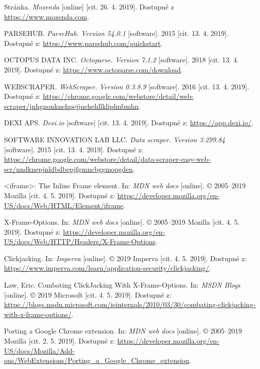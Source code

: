 \documentclass[thesis=B,czech]{FITthesis}[2012/06/26]
\begin{document}
\begin{thebibliography}{99}
	Stránka. \textit{Mozenda} [online] [cit. 26. 4. 2019]. Dostupné z \url{https://www.mozenda.com}.
	
	PARSEHUB. \textit{ParseHub. Version 54.0.1} [software]. 2015 [cit. 13. 4. 2019]. Dostupné z: \url{https://www.parsehub.com/quickstart}.
	
	OCTOPUS DATA INC. \textit{Octoparse. Version 7.1.2} [software]. 2018 [cit. 13. 4. 2019]. Dostupné z: \url{https://www.octoparse.com/download}.
	
	WEBSCRAPER. \textit{WebScraper. Version 0.3.8.9} [software]. 2016 [cit. 13. 4. 2019]. Dostupné z: \url{https://chrome.google.com/webstore/detail/web-scraper/jnhgnonknehpejjnehehllkliplmbmhn}.
	
	DEXI APS. \textit{Dexi.io} [software] [cit. 13. 4. 2019]. Dostupné z: \url{https://app.dexi.io/}.
	
	SOFTWARE INNOVATION LAB LLC. \textit{Data scraper. Version 3.299.84} [software]. 2015 [cit. 13. 4. 2019]. Dostupné z: \url{https://chrome.google.com/webstore/detail/data-scraper-easy-web-scr/nndknepjnldbdbepjfgmncbggmopgden}.
	
	\textless iframe\textgreater: The Inline Frame element. In: \textit{MDN web docs} [online]. © 2005--2019 Mozilla [cit. 4. 5. 2019]. Dostupné z: \url{https://developer.mozilla.org/en-US/docs/Web/HTML/Element/iframe}.
	
	X-Frame-Options. In: \textit{MDN web docs} [online]. © 2005--2019 Mozilla [cit. 4. 5. 2019]. Dostupné z: \url{https://developer.mozilla.org/en-US/docs/Web/HTTP/Headers/X-Frame-Options}.
	
	Clickjacking. In: \textit{Imperva} [online]. © 2019 Imperva [cit. 4. 5. 2019]. Dostupné z: \url{https://www.imperva.com/learn/application-security/clickjacking/}.
	
	Law, Eric. Combating ClickJacking With X-Frame-Options. In: \textit{MSDN Blogs} [online]. © 2019 Microsoft [cit. 4. 5. 2019]. Dostupné z: \url{https://blogs.msdn.microsoft.com/ieinternals/2010/03/30/combating-clickjacking-with-x-frame-options/}.
	
	Porting a Google Chrome extension. In: \textit{MDN web docs} [online]. © 2005--2019 Mozilla [cit. 2. 5. 2019]. Dostupné z: \url{https://developer.mozilla.org/en-US/docs/Mozilla/Add-ons/WebExtensions/Porting_a_Google_Chrome_extension}.
	
\end{thebibliography}
\end{document}
